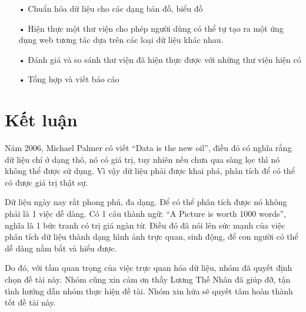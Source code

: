 \documentclass[12pt,a4paper]{article}
\begin{document}
\begin{itemize}
\item[•]Chuẩn hóa dữ liệu cho các dạng bản đồ, biểu đồ

\item[•]Hiện thực một thư viện cho phép người dùng có thể tự tạo ra một ứng dụng web tương tác dựa trên các loại dữ liệu khác nhau.

\item[•]Đánh giá và so sánh thư viện đã hiện thực được với những thư viện hiện có

\item[•]Tổng hợp và viết báo cáo

\end{itemize}


\section{Kết luận}
Năm 2006, Michael Palmer có viết “Data is the new oil”, điều đó có nghĩa rằng dữ liệu chỉ ở dạng thô, nó có giá trị, tuy nhiên nếu chưa qua sàng lọc thì nó không thể được sử dụng. Vì vậy dữ liệu phải được khai phá, phân tích để có thể có được giá trị thật sự.

Dữ liệu ngày nay rất phong phú, đa dạng. Để có thể phân tích được nó không phải là 1 việc dễ dàng. Có 1 câu thành ngữ: “A Picture is worth 1000 words”, nghĩa là 1 bức tranh có trị giá ngàn từ. Điều đó đã nói lên sức mạnh của việc phân tích dữ liệu thành dạng hình ảnh trực quan, sinh động, để con người có thể dễ dàng nắm bắt và hiểu được.

Do đó, với tầm quan trọng của việc trực quan hóa dữ liệu, nhóm đã quyết định chọn đề tài này. Nhóm cũng xin cảm ơn thầy Lương Thế Nhân đã giúp đỡ, tận tình hướng dẫn nhóm thực hiện đề tài. Nhóm xin hứa sẽ quyết tâm hoàn thành tốt đề tài này.

\newpage
\end{document}
